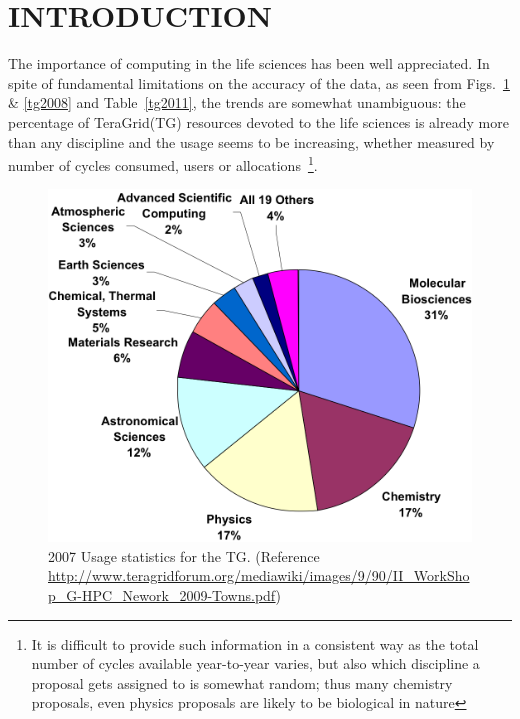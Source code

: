 \documentclass{sig-alternate}
\begin{document}
\section{INTRODUCTION}


The importance of computing in the life sciences has been well
appreciated. %
In spite of fundamental limitations on the accuracy of the data, as
seen from Figs.~\ref{tg2007} \& \ref{tg2008} and Table~\ref{tg2011},
the trends are somewhat unambiguous: the percentage of TeraGrid(TG)
resources devoted to the life sciences is already more than any
discipline and the usage seems to be increasing, whether measured by
number of cycles consumed, users or allocations~\footnote{It is
  difficult to provide such information in a consistent way as the
  total number of cycles available year-to-year varies, but also which
  discipline a proposal gets assigned to is somewhat random; thus many
  chemistry proposals, even physics proposals are likely to be
  biological in nature}.



\begin{figure}
 \centering
\includegraphics[scale=0.40]{figures/teragrid-discipline07}
\caption{\small 2007 Usage statistics for the TG.  (Reference
  \url{http://www.teragridforum.org/mediawiki/images/9/90/II_WorkShop_G-HPC_Nework_2009-Towns.pdf})}
  \label{tg2007}
\end{figure}
\end{document}
